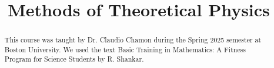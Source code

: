 \documentclass[11pt, letterpaper]{report}
\title{Methods of Theoretical Physics}
\begin{document}
    \maketitle
    \begin{abstract}
    	This course was taught by Dr. Claudio Chamon during the Spring 2025 semester at Boston University. We used the text Basic Training in Mathematics: A Fitness Program for Science Students by R. Shankar.
    \end{abstract}
    \tableofcontents
    
    
    
    
\end{document}
